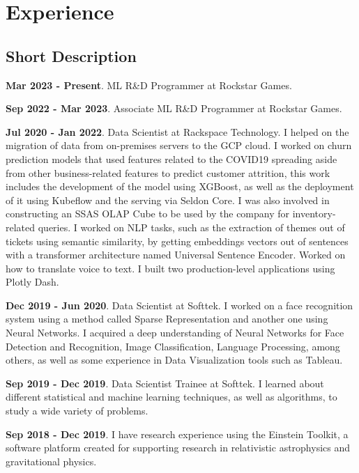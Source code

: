 \documentclass[a4paper,10pt]{article} %
\begin{document}

\section{Experience}
\bigskip

\subsection{Short Description}
\vspace{0.2cm}

\textbf{Mar 2023 - Present}. ML R\&D Programmer at Rockstar Games. 

\textbf{Sep 2022 - Mar 2023}. Associate ML R\&D Programmer at Rockstar Games.

\textbf{Jul 2020 - Jan 2022}. Data Scientist at Rackspace Technology. I helped on the migration of data from on-premises servers to the GCP cloud. I worked on churn prediction models that used features related to the COVID19 spreading aside from other business-related features to predict customer attrition, this work includes the development of the model using XGBoost, as well as the deployment of it using Kubeflow and the serving via Seldon Core. I was also involved in constructing an SSAS OLAP Cube to be used by the company for inventory-related queries. I worked on NLP tasks, such as the extraction of themes out of tickets using semantic similarity, by getting embeddings vectors out of sentences with a transformer architecture named Universal Sentence Encoder. Worked on how to translate voice to text. I built two production-level applications using Plotly Dash.

\textbf{Dec 2019 - Jun 2020}. Data Scientist at Softtek. I worked on a face recognition system using a method called Sparse Representation and another one using Neural Networks. I acquired a deep understanding of Neural Networks for Face Detection and Recognition, Image Classification, Language Processing, among others, as well as some experience in Data Visualization tools such as Tableau.

\textbf{Sep 2019 - Dec 2019}. Data Scientist Trainee at Softtek. I learned about different statistical and machine learning techniques, as well as algorithms, to study a wide variety of problems.

\textbf{Sep 2018 - Dec 2019}. I have research experience using the Einstein Toolkit, a software platform created for supporting research in relativistic astrophysics and gravitational physics.
\end{document}
